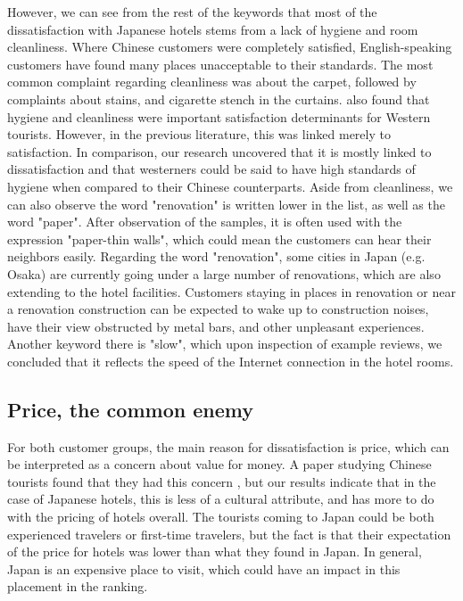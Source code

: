 However, we can see from the rest of the keywords that most of the dissatisfaction with Japanese hotels stems from a lack of hygiene and room cleanliness. Where Chinese customers were completely satisfied, English-speaking customers have found many places unacceptable to their standards. The most common complaint regarding cleanliness was about the carpet, followed by complaints about stains, and cigarette stench in the curtains. \cite{kozak2002} also found that hygiene and cleanliness were important satisfaction determinants for Western tourists. However, in the previous literature, this was linked merely to satisfaction. In comparison, our research uncovered that it is mostly linked to dissatisfaction and that westerners could be said to have high standards of hygiene when compared to their Chinese counterparts. Aside from cleanliness, we can also observe the word "renovation" is written lower in the list, as well as the word "paper". After observation of the samples, it is often used with the expression "paper-thin walls", which could mean the customers can hear their neighbors easily. Regarding the word "renovation", some cities in Japan (e.g. Osaka) are currently going under a large number of renovations, which are also extending to the hotel facilities. Customers staying in places in renovation or near a renovation construction can be expected to wake up to construction noises, have their view obstructed by metal bars, and other unpleasant experiences. Another keyword there is "slow", which upon inspection of example reviews, we concluded that it reflects the speed of the Internet connection in the hotel rooms.

\subsection{Price, the common enemy}\label{disc:price}

For both customer groups, the main reason for dissatisfaction is price, which can be interpreted as a concern about value for money. A paper studying Chinese tourists found that they had this concern \cite[][]{truong2009}, but our results indicate that in the case of Japanese hotels, this is less of a cultural attribute, and has more to do with the pricing of hotels overall. The tourists coming to Japan could be both experienced travelers or first-time travelers, but the fact is that their expectation of the price for hotels was lower than what they found in Japan. In general, Japan is an expensive place to visit, which could have an impact in this placement in the ranking. 

